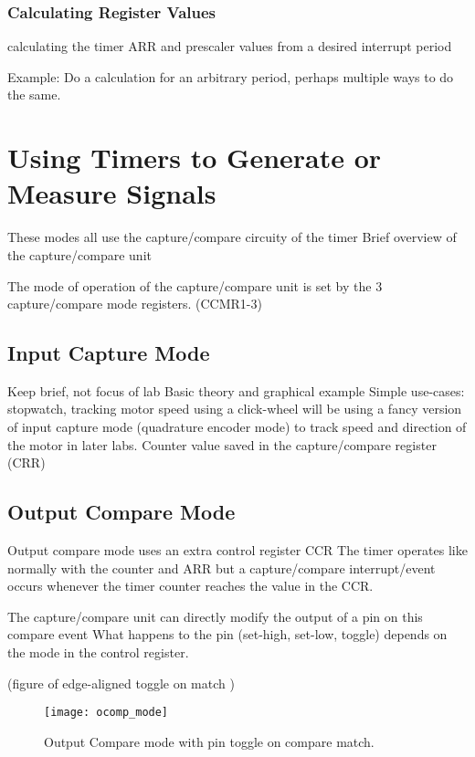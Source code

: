 \documentclass[11pt,fleqn]{book} %
\begin{document}
    \subsubsection{Calculating Register Values}
        calculating the timer ARR and prescaler values from a desired interrupt period 
        	
        \begin{example} 
                Example: Do a calculation for an arbitrary period, perhaps multiple ways to do the same. 
        \end{example}
    

\section{Using Timers to Generate or Measure Signals}
    These modes all use the capture/compare circuity of the timer
    Brief overview of the capture/compare unit
    
    The mode of operation of the capture/compare unit is set by the 3 capture/compare mode registers. (CCMR1-3)				
    
    \subsection{Input Capture Mode}
        Keep brief, not focus of lab
        Basic theory and graphical example		
        Simple use-cases: stopwatch, tracking motor speed using a click-wheel
            will be using a fancy version of input capture mode (quadrature encoder mode) to track speed and direction of the motor in later labs.
        Counter value saved in the capture/compare register (CRR)
    
    \subsection{Output Compare Mode}
        Output compare mode uses an extra control register CCR
        The timer operates like normally with the counter and ARR but a capture/compare interrupt/event occurs whenever the timer counter reaches the value in the CCR.
        
        The capture/compare unit can directly modify the output of a pin on this compare event
        What happens to the pin (set-high, set-low, toggle) depends on the mode in the control register. 
        
        (figure of edge-aligned toggle on match )
        \begin{figure}[]
            \centering\texttt{[image: ocomp\_mode]}
            \caption{Output Compare mode with pin toggle on compare match.}
            \label{ocomp_mode}
        \end{figure}
    
\end{document}
